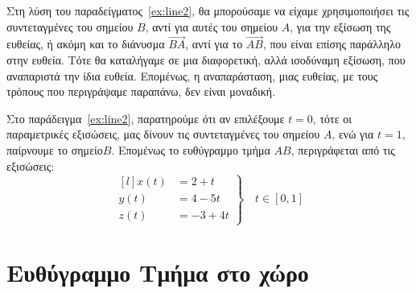 \begin{rem}
  Στη λύση του παραδείγματος~\ref{ex:line2}, θα μπορούσαμε να είχαμε χρησιμοποιήσει 
  τις συντεταγμένες του σημείου $ B $, αντί για αυτές του σημείου $A$, για την εξίσωση 
  της ευθείας, ή ακόμη και το διάνυσμα $ \vec{BA} $, αντί για το $ \vec{AB} $, που 
  είναι επίσης παράλληλο στην ευθεία. Τότε θα καταλήγαμε σε μια διαφορετική, αλλά 
  ισοδύναμη εξίσωση, που αναπαριστά την ίδια ευθεία. Επομένως, η αναπαράσταση, μιας 
  ευθείας, με τους τρόπους που περιγράψαμε παραπάνω, δεν είναι μοναδική.
\end{rem}
\begin{rem}
  Στο παράδειγμα~\ref{ex:line2}, παρατηρούμε ότι αν επιλέξουμε $ t=0 $, τότε οι 
  παραμετρικές εξισώσεις, μας δίνουν τις συντεταγμένες του σημείου $ A $, ενώ για 
  $ t=1 $, παίρνουμε το σημείο$ B $. Επομένως το ευθύγραμμο τμήμα $ AB $, 
  περιγράφεται από τις εξισώσεις:
  \[
    \left.
      \begin{matrix*}[l]
        x(t) &= 2+t \\
        y(t) &= 4-5t \\
        z(t) &= -3+4t
      \end{matrix*} 
    \right\} \quad  t \in [0,1]
  \]
\end{rem}


\section*{Ευθύγραμμο Τμήμα στο χώρο}

\begin{figure}
\end{figure}

